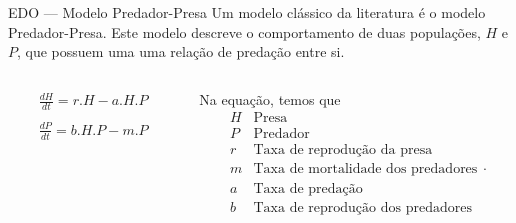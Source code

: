\begin{frame}{EDO — Modelo Predador-Presa}
    Um modelo clássico da literatura é o modelo Predador-Presa. Este modelo descreve o comportamento de duas populações, $H$ e $P$, que possuem uma uma relação de predação entre si. 

    \begin{columns}
        \begin{column}{.3\textwidth}
            \begin{equation}\label{eq:predadorpresa}
                \begin{array}{lr}
                    \frac{dH}{dt} = r.H - a.H.P
                    \\
                    \\
                    \frac{dP}{dt} = b.H.P - m.P
                \end{array}
            \end{equation}
        \end{column}
        \begin{column}{.6\textwidth}
            Na equação, temos que
            \[
            \begin{array}{lr}
                H & \text{Presa}\\
                P & \text{Predador}\\
                r & \text{Taxa de reprodução da presa}\\
                m & \text{Taxa de mortalidade dos predadores}\\
                a & \text{Taxa de predação}\\
                b & \text{Taxa de reprodução dos predadores}\\
                \end{array}.
            \]
        \end{column}
    \end{columns}

\end{frame}
